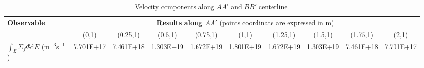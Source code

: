 \documentclass[letterpaper,11pt]{article}
\begin{document}
\begin{table}[htb!]
	\caption{Velocity components along $AA'$ and $BB'$ centerline.}
	\centering
	\footnotesize
	\setlength\tabcolsep{1.5pt}
	\begin{tabular}{l c c c c c c c c c}
		\toprule
		\multirow{2}{*}{\textbf{Observable}} & \multicolumn{9}{c}{\textbf{Results along $AA'$} (points coordinate are expressed in m)} \\
		& {(0,1)} & {(0.25,1)} & {(0.5,1)} & {(0.75,1)} & {(1,1)} & {(1.25,1)} & {(1.5,1)} & {(1.75,1)} & {(2,1)} \\
		\midrule
		$\int_E \Sigma_f \Phi$d$E$ (m$^{-3}$s$^{-1}$) & 7.701E+17 & 7.461E+18
		& 1.303E+19 & 1.672E+19 & 1.801E+19 & 1.672E+19 & 1.303E+19 &
		7.461E+18 & 7.701E+17 \\
		\bottomrule
	\end{tabular}
\end{table}
\end{document}
